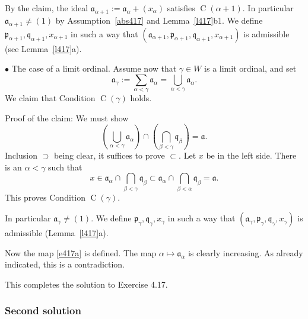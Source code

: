 \documentclass[parskip=half,fontsize=12pt]{scrartcl}%
\newcommand{\oo}{\operatorname}\newcommand{\ooo}{\operatorname*}
\newcommand{\mf}{\mathfrak}
\newcommand{\aaa}{\mf a}
\newcommand{\ppp}{\mf p}
\newcommand{\qqq}{\mf q}
\newcommand{\bu}{\bullet}
\begin{document}
By the claim, the ideal $\aaa_{\alpha+1}:=\aaa_\alpha+(x_\alpha)$ satisfies $\oo C(\alpha+1)$. In particular $\aaa_{\alpha+1}\ne(1)$ by Assumption~\eqref{abs417} and Lemma~\ref{l417}b1. We define $\ppp_{\alpha+1},\qqq_{\alpha+1},x_{\alpha+1}$ in such a way that $(\aaa_{\alpha+1},\ppp_{\alpha+1},\qqq_{\alpha+1},x_{\alpha+1})$ is admissible (see Lemma~\ref{l417}a).


$\bu$ The case of a limit ordinal. Assume now that $\gamma\in W$ is a limit ordinal, and set 
$$
\aaa_\gamma:=\sum_{\alpha<\gamma}\aaa_\alpha=\bigcup_{\alpha<\gamma}\aaa_\alpha.
$$ 
We claim that Condition $\oo C(\gamma)$ holds.

Proof of the claim: We must show 
$$
\left(\bigcup_{\alpha<\gamma}\aaa_\alpha\right)\cap\left(\bigcap_{\beta<\gamma}\qqq_\beta\right)=\aaa.
$$ 
Inclusion $\supset$ being clear, it suffices to prove $\subset$. Let $x$ be in the left side. There is an $\alpha<\gamma$ such that 
$$
x\in\aaa_\alpha\cap\bigcap_{\beta<\gamma}\qqq_\beta\subset\aaa_\alpha\cap\bigcap_{\beta<\alpha}\qqq_\beta=\aaa.
$$ 
This proves Condition $\oo C(\gamma)$. 

In particular $\aaa_\gamma\ne(1)$. We define $\ppp_\gamma,\qqq_\gamma,x_\gamma$ in such a way that $(\aaa_\gamma,\ppp_\gamma,\qqq_\gamma,x_\gamma)$ is admissible (Lemma~\ref{l417}a).

Now the map \eqref{e417a} is defined. The map $\alpha\mapsto\aaa_\alpha$ is clearly increasing. As already indicated, this is a contradiction.

This completes the solution to Exercise 4.17. %

\subsubsection{Second solution}\label{for418}%
\end{document}
